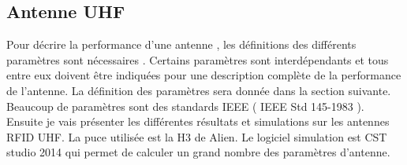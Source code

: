 \documentclass[11pt, a4paper, twoside]{book}
\begin{document}
\subsection{Antenne UHF}

Pour décrire la performance d'une antenne , les définitions des différents paramètres sont nécessaires . Certains paramètres sont interdépendants et tous entre eux doivent être indiquées pour une description complète de la performance de l'antenne. La définition des paramètres sera donnée dans la section suivante. Beaucoup de paramètres sont des standards IEEE  ( IEEE Std 145-1983 ). Ensuite je vais présenter les différentes résultats et simulations sur les antennes RFID UHF. La puce utilisée est la H3 de Alien. Le logiciel simulation est CST studio 2014 qui permet de calculer un grand nombre des paramètres d'antenne.\\
\end{document}
